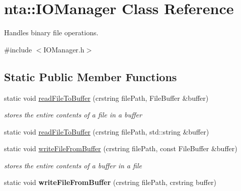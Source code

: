 \hypertarget{classnta_1_1IOManager}{}\section{nta\+:\+:I\+O\+Manager Class Reference}
\label{classnta_1_1IOManager}


Handles binary file operations.  




{\ttfamily \#include $<$I\+O\+Manager.\+h$>$}

\subsection*{Static Public Member Functions}
\begin{DoxyCompactItemize}
\item 
\mbox{\label{classnta_1_1IOManager_a8225f73838465f27e6fa60b689496d10}} 
static void \hyperlink{classnta_1_1IOManager_a8225f73838465f27e6fa60b689496d10}{read\+File\+To\+Buffer} (crstring file\+Path, File\+Buffer \&buffer)
\begin{DoxyCompactList}\small\item\em stores the entire contents of a file in a buffer \end{DoxyCompactList}\item 
static void \hyperlink{classnta_1_1IOManager_abbfd9da05b22aa488043a19344d38e0a}{read\+File\+To\+Buffer} (crstring file\+Path, std\+::string \&buffer)
\item 
\mbox{\label{classnta_1_1IOManager_a8e22ef5a2e46a48abdefa21847cf9eff}} 
static void \hyperlink{classnta_1_1IOManager_a8e22ef5a2e46a48abdefa21847cf9eff}{write\+File\+From\+Buffer} (crstring file\+Path, const File\+Buffer \&buffer)
\begin{DoxyCompactList}\small\item\em stores the entire contents of a buffer in a file \end{DoxyCompactList}\item 
\mbox{\label{classnta_1_1IOManager_a88a69469ca9a8c4a632e7d7e14ae3d79}} 
static void {\bfseries write\+File\+From\+Buffer} (crstring file\+Path, crstring buffer)
\item 
\mbox{\label{classnta_1_1IOManager_aa9855baef3ed91e4e95e3a5e899ba473}} 

\end{DoxyCompactItemize}
